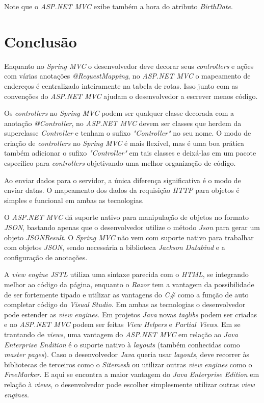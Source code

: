 
Note que o \textit{ASP.NET MVC} exibe também a hora do atributo \textit{BirthDate}.

\section{Conclusão}

Enquanto no \textit{Spring MVC} o desenvolvedor deve decorar seus \textit{controllers} e ações com várias anotações \textit{@RequestMapping}, no \textit{ASP.NET MVC} o mapeamento de endereços é centralizado inteiramente na tabela de rotas. Isso junto com as convenções do \textit{ASP.NET MVC} ajudam o desenvolvedor a escrever menos código.

Os \textit{controllers} no \textit{Spring MVC} podem ser qualquer classe decorada com a anotação \textit{@Controller}, no \textit{ASP.NET MVC} devem ser classes que herdem da superclasse \textit{Controller} e tenham o sufixo \textit{"Controller"} no seu nome. O modo de criação de \textit{controllers} no \textit{Spring MVC} é mais flexível, mas é uma boa prática também adicionar o sufixo \textit{"Controller"} em tais classes e deixá-las em um pacote específico para \textit{controllers} objetivando uma melhor organização de código.

Ao enviar dados para o servidor, a única diferença significativa é o modo de enviar datas. O mapeamento dos dados da requisição \textit{HTTP} para objetos é simples e funcional em ambas as tecnologias.

O \textit{ASP.NET MVC} dá suporte nativo para manipulação de objetos no formato \textit{JSON}, bastando apenas que o desenvolvedor utilize o método \textit{Json} para gerar um objeto \textit{JSONResult}. O \textit{Spring MVC} não vem com suporte nativo para trabalhar com objetos \textit{JSON}, sendo necessária a biblioteca \textit{Jackson Databind} e a configuração de anotações.

A \textit{view engine} \textit{JSTL} utiliza uma sintaxe parecida com o \textit{HTML}, se integrando melhor ao código da página, enquanto o \textit{Razor} tem a vantagem da possibilidade de ser fortemente tipado e utilizar as vantagens do \textit{C\#} como a função de auto completar código do \textit{Visual Studio}. Em ambas as tecnologias o desenvolvedor pode estender as \textit{view engines}. Em projetos \textit{Java} novas \textit{taglibs} podem ser criadas e no \textit{ASP.NET MVC} podem ser feitas \textit{View Helpers} e \textit{Partial Views}. Em se trantando de \textit{views}, uma vantagem do \textit{ASP.NET MVC} em relação ao \textit{Java Enterprise Endition} é o suporte nativo à \textit{layouts} (também conhecidas como \textit{master pages}). Caso o desenvolvedor \textit{Java} queria usar \textit{layouts}, deve recorrer às bibliotecas de terceiros como o \textit{Sitemesh} ou utilizar outras \textit{view engines} como o \textit{FreeMarker}. E aqui se encontra a maior vantagem do \textit{Java Enterprise Edition} em relação à \textit{views}, o desenvolvedor pode escolher simplesmente utilizar outras \textit{view engines}.

